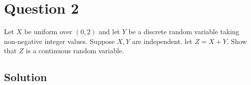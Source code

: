 \section*{Question 2}

Let \( X \) be uniform over \( (0,2) \) and let \( Y \) be a discrete random variable taking non-negative integer values.
Suppose \( X, Y \) are independent.
let \( Z=X+Y \).
Show that \( Z \) is a continuous random variable.

\subsection*{Solution}
